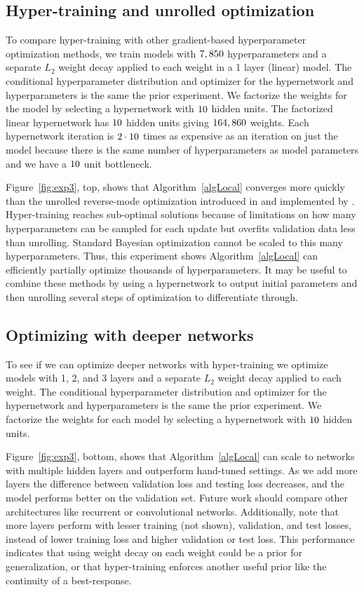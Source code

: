 \documentclass{article} %
\begin{document}
\subsection{Hyper-training and unrolled optimization}
To compare hyper-training with other gradient-based hyperparameter optimization methods, we train models with $7,850$ hyperparameters and a separate $L_{2}$ weight decay applied to each weight in a 1 layer (linear) model.
The conditional hyperparameter distribution and optimizer for the hypernetwork and hyperparameters is the same the prior experiment.
We factorize the weights for the model by selecting a hypernetwork with $10$ hidden units.
The factorized linear hypernetwork has $10$ hidden units giving $164,860$ weights.
Each hypernetwork iteration is $2 \cdot 10$ times as expensive as an iteration on just the model because there is the same number of hyperparameters as model parameters and we have a $10$ unit bottleneck.

Figure~\ref{fig:exp3}, top, shows that Algorithm~\ref{algLocal} converges more quickly than the unrolled reverse-mode optimization introduced in \citet{maclaurin2015gradient} and implemented by \citet{franceschi2017forward}.
Hyper-training reaches sub-optimal solutions because of limitations on how many hyperparameters can be sampled for each update but overfits validation data less than unrolling.
Standard Bayesian optimization cannot be scaled to this many hyperparameters.
Thus, this experiment shows Algorithm~\ref{algLocal} can efficiently partially optimize thousands of hyperparameters.
It may be useful to combine these methods by using a hypernetwork to output initial parameters and then unrolling several steps of optimization to differentiate through.

\subsection{Optimizing with deeper networks}
To see if we can optimize deeper networks with hyper-training we optimize models with 1, 2, and 3 layers and a separate $L_{2}$ weight decay applied to each weight.
The conditional hyperparameter distribution and optimizer for the hypernetwork and hyperparameters is the same the prior experiment.
We factorize the weights for each model by selecting a hypernetwork with $10$ hidden units.

Figure~\ref{fig:exp3}, bottom, shows that Algorithm~\ref{algLocal} can scale to networks with multiple hidden layers and outperform hand-tuned settings.
As we add more layers the difference between validation loss and testing loss decreases, and the model performs better on the validation set.
Future work should compare other architectures like recurrent or convolutional networks.
Additionally, note that more layers perform with lesser training (not shown), validation, and test losses, instead of lower training loss and higher validation or test loss.
This performance indicates that using weight decay on each weight could be a prior for generalization, or that hyper-training enforces another useful prior like the continuity of a best-response.
\end{document}

